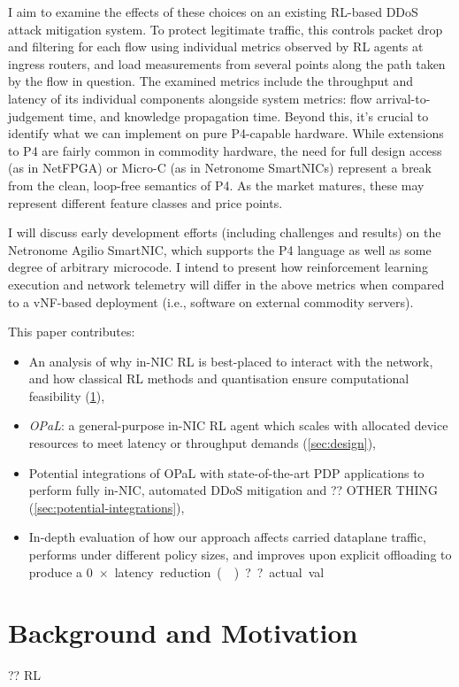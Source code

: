 \documentclass[sigconf,natbib=false]{acmart}
\newcommand{\approachshort}{OPaL}
\begin{document}
I aim to examine the effects of these choices on an existing RL-based DDoS attack mitigation system. To protect legitimate traffic, this controls packet drop and filtering for each flow using individual metrics observed by RL agents at ingress routers, and load measurements from several points along the path taken by the flow in question. The examined metrics include the throughput and latency of its individual components alongside system metrics: flow arrival-to-judgement time, and knowledge propagation time. Beyond this, it's crucial to identify what we can implement on pure P4-capable hardware. While extensions to P4 are fairly common in commodity hardware, the need for full design access (as in NetFPGA) or Micro-C (as in Netronome SmartNICs) represent a break from the clean, loop-free semantics of P4. As the market matures, these may represent different feature classes and price points.

I will discuss early development efforts (including challenges and results) on the Netronome Agilio SmartNIC, which supports the P4 language as well as some degree of arbitrary microcode. I intend to present how reinforcement learning execution and network telemetry will differ in the above metrics when compared to a vNF-based deployment (i.e., software on external commodity servers).

This paper contributes:
\begin{itemize}
	\item An analysis of why in-NIC RL is best-placed to interact with the network, and how classical RL methods and quantisation ensure computational feasibility (\cref{sec:motivation}),
	\item \emph{\approachshort{}}: a general-purpose in-NIC RL agent which scales with allocated device resources to meet latency or throughput demands (\cref{sec:design}),
	\item Potential integrations of \approachshort{} with state-of-the-art PDP applications to perform fully in-NIC, automated DDoS mitigation and ?? OTHER THING (\cref{sec:potential-integrations}),
	\item In-depth evaluation of how our approach affects carried dataplane traffic, performs under different policy sizes, and improves upon explicit offloading to produce a \SI{0}{$\times$} latency reduction (). ??actual val
\end{itemize}

\section{Background and Motivation}\label{sec:motivation}
?? RL~\parencite{RL2E}
\end{document}
